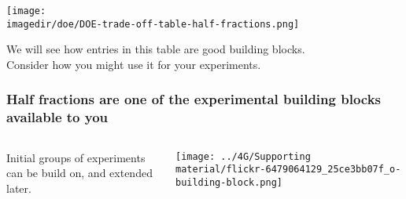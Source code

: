 \begin{frame}\frametitle{}
	\texttt{[image: \\imagedir/doe/DOE-trade-off-table-half-fractions.png]}
	
	\vspace{-10pt}
	We will see how entries in this table are good building blocks.\\
	Consider how you might use it for your experiments.
\end{frame}

\begin{frame}\frametitle{Half fractions are  one of the experimental building blocks available to you}
	
	\begin{columns}[C]
		
	
			Initial groups of experiments can be build on, and extended later.
			
			
				\centerline{\texttt{[image: ../4G/Supporting material/flickr-6479064129\_25ce3bb07f\_o-building-block.png]} \quad
				}
		
				
		
	\end{columns}
\end{frame}